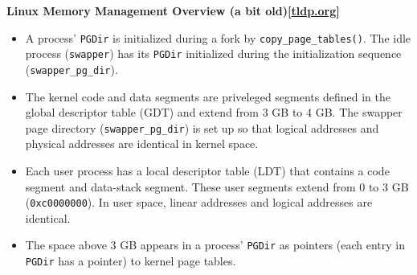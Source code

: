 \textbf{Linux Memory Management Overview (a bit
  old)[\href{http://tldp.org/LDP/khg/HyperNews/get/memory/linuxmm.html}{tldp.org}]}
\begin{itemize}
\item A process' \texttt{PGDir} is initialized during a fork by
  \texttt{copy\_page\_tables()}. The idle process (\texttt{swapper}) has its \texttt{PGDir}
  initialized during the initialization sequence (\texttt{swapper\_pg\_dir}).
\item The kernel code and data segments are priveleged segments defined in the global
  descriptor table (GDT) and extend from 3 GB to 4 GB. The swapper page directory
  (\texttt{swapper\_pg\_dir}) is set up so that logical addresses and physical addresses are
  identical in kernel space.
\item Each user process has a local descriptor table (LDT) that contains a code segment and
  data-stack segment. These user segments extend from 0 to 3 GB (\texttt{0xc0000000}). In user
  space, linear addresses and logical addresses are identical.
\item The space above 3 GB appears in a process' \texttt{PGDir} as pointers (each entry in
  \texttt{PGDir} has a pointer) to kernel page tables. 


\end{itemize}
